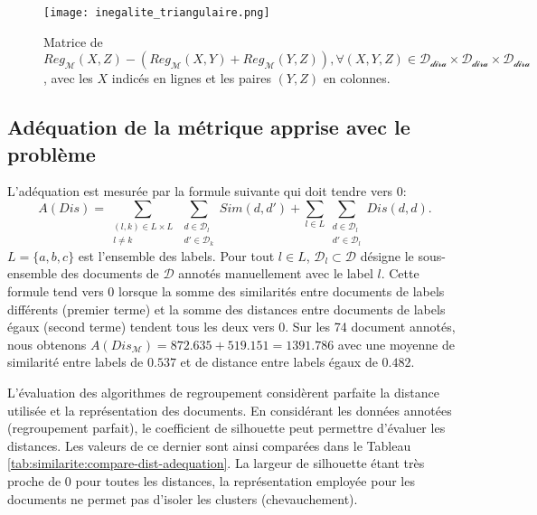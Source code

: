 \begin{figure}[!htb]
	\centering \texttt{[image: inegalite\_triangulaire.png]}
	\caption{Matrice de $Reg_\mathcal{M}(X,Z) - (Reg_\mathcal{M}(X,Y) + Reg_\mathcal{M}(Y,Z)), \forall (X,Y,Z) \in \mathcal{D_{\text{dira}}} \times \mathcal{D_{\text{dira}}} \times \mathcal{D_{\text{dira}}}$, avec les $X$ indicés en lignes et les paires $(Y,Z)$ en colonnes. }\label{fig:similarite:matrice_inegalite_triangulaire}
\end{figure}
 


\subsection{Adéquation de la métrique apprise avec le problème}
\label{sec:similarite:adequation}
L'adéquation est mesurée par la formule suivante qui doit tendre vers 0: \[A(Dis) = \sum\limits_{\substack{(l,k) \in L \times L \\ l \neq k}} \sum\limits_{\substack{d \in \mathcal{D}_l \\ d' \in \mathcal{D}_k}} Sim(d,d') + \sum\limits_{l \in L} \sum\limits_{\substack{d \in \mathcal{D}_l \\ d' \in \mathcal{D}_l}} Dis(d,d). \] $L = \lbrace a, b, c \rbrace$ est l'ensemble des labels. Pour tout $l \in L$, $\mathcal{D}_l \subset \mathcal{D}$ désigne le sous-ensemble des documents de $\mathcal{D}$ annotés manuellement avec le label $l$. Cette formule tend vers 0 lorsque la somme des similarités entre documents de labels différents (premier terme) et la somme des distances entre documents de labels égaux (second terme) tendent tous les deux vers 0.
Sur les 74 document annotés, nous obtenons $A(Dis_\mathcal{M}) = 872.635 + 519.151 = 1391.786$ avec une moyenne de similarité entre labels de $0.537$ et de distance entre labels égaux de $0.482$.

L'évaluation des algorithmes de regroupement considèrent parfaite la distance utilisée et la représentation des documents. En considérant les données annotées (regroupement parfait), le coefficient de silhouette peut  permettre d'évaluer les distances. Les valeurs de ce dernier sont ainsi comparées dans le Tableau \ref{tab:similarite:compare-dist-adequation}. La largeur de silhouette étant très proche de 0 pour toutes les distances, la représentation employée pour les documents  ne permet pas d'isoler les clusters (chevauchement). 

